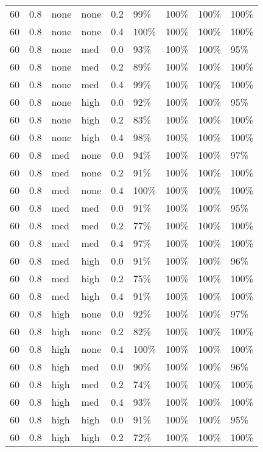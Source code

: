 \begin{longtable}{rrllrllll}
  60 & 0.8 & none & none & 0.2 & 99\% & 100\% & 100\% & 100\% \\ 
  60 & 0.8 & none & none & 0.4 & 100\% & 100\% & 100\% & 100\% \\ 
  60 & 0.8 & none & med & 0.0 & 93\% & 100\% & 100\% & 95\% \\ 
  60 & 0.8 & none & med & 0.2 & 89\% & 100\% & 100\% & 100\% \\ 
  60 & 0.8 & none & med & 0.4 & 99\% & 100\% & 100\% & 100\% \\ 
  60 & 0.8 & none & high & 0.0 & 92\% & 100\% & 100\% & 95\% \\ 
  60 & 0.8 & none & high & 0.2 & 83\% & 100\% & 100\% & 100\% \\ 
  60 & 0.8 & none & high & 0.4 & 98\% & 100\% & 100\% & 100\% \\ 
  60 & 0.8 & med & none & 0.0 & 94\% & 100\% & 100\% & 97\% \\ 
  60 & 0.8 & med & none & 0.2 & 91\% & 100\% & 100\% & 100\% \\ 
  60 & 0.8 & med & none & 0.4 & 100\% & 100\% & 100\% & 100\% \\ 
  60 & 0.8 & med & med & 0.0 & 91\% & 100\% & 100\% & 95\% \\ 
  60 & 0.8 & med & med & 0.2 & 77\% & 100\% & 100\% & 100\% \\ 
  60 & 0.8 & med & med & 0.4 & 97\% & 100\% & 100\% & 100\% \\ 
  60 & 0.8 & med & high & 0.0 & 91\% & 100\% & 100\% & 96\% \\ 
  60 & 0.8 & med & high & 0.2 & 75\% & 100\% & 100\% & 100\% \\ 
  60 & 0.8 & med & high & 0.4 & 91\% & 100\% & 100\% & 100\% \\ 
  60 & 0.8 & high & none & 0.0 & 92\% & 100\% & 100\% & 97\% \\ 
  60 & 0.8 & high & none & 0.2 & 82\% & 100\% & 100\% & 100\% \\ 
  60 & 0.8 & high & none & 0.4 & 100\% & 100\% & 100\% & 100\% \\ 
  60 & 0.8 & high & med & 0.0 & 90\% & 100\% & 100\% & 96\% \\ 
  60 & 0.8 & high & med & 0.2 & 74\% & 100\% & 100\% & 100\% \\ 
  60 & 0.8 & high & med & 0.4 & 93\% & 100\% & 100\% & 100\% \\ 
  60 & 0.8 & high & high & 0.0 & 91\% & 100\% & 100\% & 95\% \\ 
  60 & 0.8 & high & high & 0.2 & 72\% & 100\% & 100\% & 100\% \\ 

\end{longtable}
